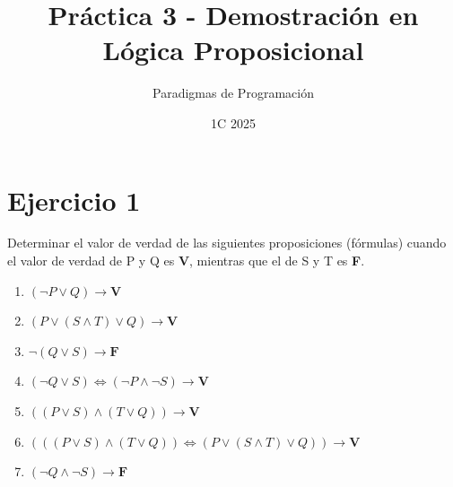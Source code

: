 \documentclass{article}
\title{Práctica 3 - Demostración en Lógica Proposicional}
\author{Paradigmas de Programación}
\date{1C 2025}
\begin{document}
\renewcommand{\baselinestretch}{1.5} 
\maketitle

\section*{Ejercicio 1}{Determinar el valor de verdad de las siguientes proposiciones (fórmulas) cuando el valor de verdad de P y Q es \textbf{V}, mientras que el de S y T es \textbf{F}.}
{\begin{enumerate}[label=\roman*.,font=\itshape]
\item {$(\lnot P \lor Q) \rightarrow \textbf{V}$}
\item {$(P \lor (S \land T) \lor Q) \rightarrow \textbf{V}$}
\item {$\lnot (Q \lor S) \rightarrow \textbf{F}$}
\item {$(\lnot Q \lor S) \iff (\lnot P \land \lnot S) \rightarrow \textbf{V}$}
\item {$((P \lor S) \land (T \lor Q)) \rightarrow \textbf{V}$}
\item {$(((P \lor S) \land (T \lor Q)) \iff (P \lor (S \land T ) \lor Q)) \rightarrow \textbf{V}$}
\item {$(\lnot Q \land \lnot S) \rightarrow \textbf{F}$}
\end{enumerate}}
\end{document}
